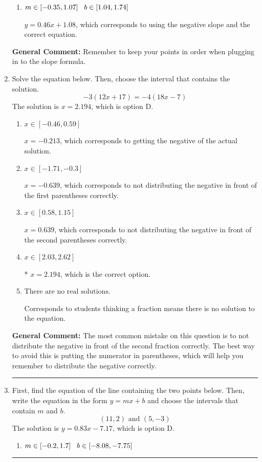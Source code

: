 \documentclass{extbook}[14pt]
\newcommand{\litem}[1]{\item #1

\rule{\textwidth}{0.4pt}}
\begin{document}
\begin{enumerate}
{\begin{enumerate}[label=\Alph*.]
* $y = -0.46x + 2.92$, which is the correct option.
\item \( m \in [-0.35, 1.07] \hspace*{3mm} b \in [1.04, 1.74] \)

 $y = 0.46x + 1.08$, which corresponds to using the negative slope and the correct equation.
\end{enumerate}

\textbf{General Comment:} Remember to keep your points in order when plugging in to the slope formula.
}
\litem{
Solve the equation below. Then, choose the interval that contains the solution.
\[ -3(12x + 17) = -4(18x -7) \]The solution is \( x = 2.194 \), which is option D.\begin{enumerate}[label=\Alph*.]
\item \( x \in [-0.46, 0.59] \)

$x = -0.213$, which corresponds to getting the negative of the actual solution.
\item \( x \in [-1.71, -0.3] \)

$x = -0.639$, which corresponds to not distributing the negative in front of the first parentheses correctly.
\item \( x \in [0.58, 1.15] \)

$x = 0.639$, which corresponds to not distributing the negative in front of the second parentheses correctly.
\item \( x \in [2.03, 2.62] \)

* $x = 2.194$, which is the correct option.
\item \( \text{There are no real solutions.} \)

Corresponds to students thinking a fraction means there is no solution to the equation.
\end{enumerate}

\textbf{General Comment:} The most common mistake on this question is to not distribute the negative in front of the second fraction correctly. The best way to avoid this is putting the numerator in parentheses, which will help you remember to distribute the negative correctly.
}
\litem{
First, find the equation of the line containing the two points below. Then, write the equation in the form $ y=mx+b $ and choose the intervals that contain $m$ and $b$.
\[ (11, 2) \text{ and } (5, -3) \]The solution is \( y = 0.83x -7.17 \), which is option D.\begin{enumerate}[label=\Alph*.]
\item \( m \in [-0.2, 1.7] \hspace*{3mm} b \in [-8.08, -7.75] \)


\end{enumerate}}
\end{enumerate}
\end{document}
